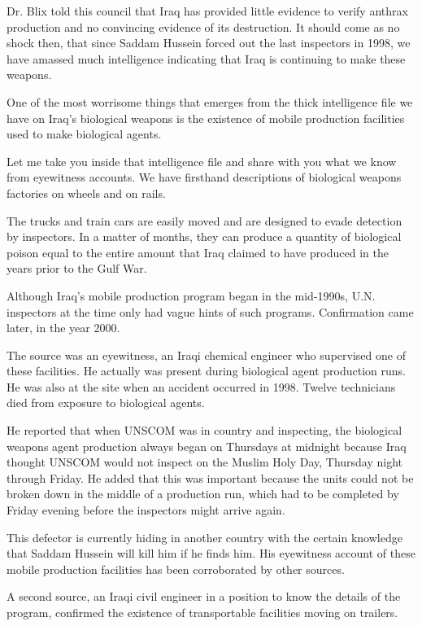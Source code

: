\documentclass[10pt,a4paper]{article}
\begin{document}
Dr. Blix told this council that Iraq has provided little evidence to verify anthrax production and no convincing evidence of its destruction. It should come as no shock then, that since Saddam Hussein forced out the last inspectors in 1998, we have amassed much intelligence indicating that Iraq is continuing to make these weapons.

One of the most worrisome things that emerges from the thick intelligence file we have on Iraq's biological weapons is the existence of mobile production facilities used to make biological agents.

Let me take you inside that intelligence file and share with you what we know from eyewitness accounts. We have firsthand descriptions of biological weapons factories on wheels and on rails.

The trucks and train cars are easily moved and are designed to evade detection by inspectors. In a matter of months, they can produce a quantity of biological poison equal to the entire amount that Iraq claimed to have produced in the years prior to the Gulf War.

Although Iraq's mobile production program began in the mid-1990s, U.N. inspectors at the time only had vague hints of such programs. Confirmation came later, in the year 2000.

The source was an eyewitness, an Iraqi chemical engineer who supervised one of these facilities. He actually was present during biological agent production runs. He was also at the site when an accident occurred in 1998. Twelve technicians died from exposure to biological agents.

He reported that when UNSCOM was in country and inspecting, the biological weapons agent production always began on Thursdays at midnight because Iraq thought UNSCOM would not inspect on the Muslim Holy Day, Thursday night through Friday. He added that this was important because the units could not be broken down in the middle of a production run, which had to be completed by Friday evening before the inspectors might arrive again.

This defector is currently hiding in another country with the certain knowledge that Saddam Hussein will kill him if he finds him. His eyewitness account of these mobile production facilities has been corroborated by other sources.

A second source, an Iraqi civil engineer in a position to know the details of the program, confirmed the existence of transportable facilities moving on trailers.
\end{document}
